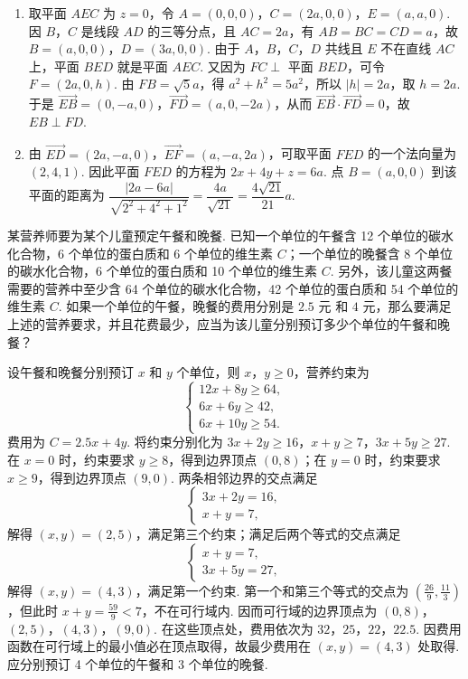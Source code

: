 \begin{solution}
\begin{enumerate}
\item 取平面 \(AEC\) 为 \(z=0\)，令 \(A=(0,0,0)\)，\(C=(2a,0,0)\)，\(E=(a,a,0)\). 因 \(B\)，\(C\) 是线段 \(AD\) 的三等分点，且 \(AC=2a\)，有 \(AB=BC=CD=a\)，故 \(B=(a,0,0)\)，\(D=(3a,0,0)\). 由于 \(A\)，\(B\)，\(C\)，\(D\) 共线且 \(E\) 不在直线 \(AC\) 上，平面 \(BED\) 就是平面 \(AEC\). 又因为 \(FC\perp\) 平面 \(BED\)，可令 \(F=(2a,0,h)\). 由 \(FB=\sqrt5a\)，得 \(a^2+h^2=5a^2\)，所以 \(|h|=2a\)，取 \(h=2a\). 于是 \(\overrightarrow{EB}=(0,-a,0)\)，\(\overrightarrow{FD}=(a,0,-2a)\)，从而 \(\overrightarrow{EB}\cdot\overrightarrow{FD}=0\)，故 \(EB\perp FD\).
\item 由 \(\overrightarrow{ED}=(2a,-a,0)\)，\(\overrightarrow{EF}=(a,-a,2a)\)，可取平面 \(FED\) 的一个法向量为 \((2,4,1)\). 因此平面 \(FED\) 的方程为 \(2x+4y+z=6a\). 点 \(B=(a,0,0)\) 到该平面的距离为
\(\dfrac{|2a-6a|}{\sqrt{2^2+4^2+1^2}}=\dfrac{4a}{\sqrt{21}}=\dfrac{4\sqrt{21}}{21}a\).
\end{enumerate}
\end{solution}

\begin{problem}
某营养师要为某个儿童预定午餐和晚餐. 已知一个单位的午餐含 12 个单位的碳水化合物，6 个单位的蛋白质和 6 个单位的维生素 \(C\)；一个单位的晚餐含 8 个单位的碳水化合物，6 个单位的蛋白质和 10 个单位的维生素 \(C\). 另外，该儿童这两餐需要的营养中至少含 64 个单位的碳水化合物，42 个单位的蛋白质和 54 个单位的维生素 \(C\). 如果一个单位的午餐，晚餐的费用分别是 \(2.5\text{ 元}\) 和 \(4\text{ 元}\)，那么要满足上述的营养要求，并且花费最少，应当为该儿童分别预订多少个单位的午餐和晚餐？
\end{problem}

\begin{solution}
设午餐和晚餐分别预订 \(x\) 和 \(y\) 个单位，则 \(x\)，\(y\ge0\)，营养约束为
\[
\begin{cases}
12x+8y\ge64,\\
6x+6y\ge42,\\
6x+10y\ge54.
\end{cases}
\]
费用为 \(C=2.5x+4y\). 将约束分别化为 \(3x+2y\ge16\)，\(x+y\ge7\)，\(3x+5y\ge27\). 在 \(x=0\) 时，约束要求 \(y\ge8\)，得到边界顶点 \((0,8)\)；在 \(y=0\) 时，约束要求 \(x\ge9\)，得到边界顶点 \((9,0)\). 两条相邻边界的交点满足
\[
\begin{cases}
3x+2y=16,\\
x+y=7,
\end{cases}
\]
解得 \((x,y)=(2,5)\)，满足第三个约束；满足后两个等式的交点满足
\[
\begin{cases}
x+y=7,\\
3x+5y=27,
\end{cases}
\]
解得 \((x,y)=(4,3)\)，满足第一个约束. 第一个和第三个等式的交点为 \((\frac{26}{9},\frac{11}{3})\)，但此时 \(x+y=\frac{59}{9}<7\)，不在可行域内. 因而可行域的边界顶点为 \((0,8)\)，\((2,5)\)，\((4,3)\)，\((9,0)\). 在这些顶点处，费用依次为 \(32\)，\(25\)，\(22\)，\(22.5\). 因费用函数在可行域上的最小值必在顶点取得，故最少费用在 \((x,y)=(4,3)\) 处取得. 应分别预订 4 个单位的午餐和 3 个单位的晚餐.
\end{solution}

